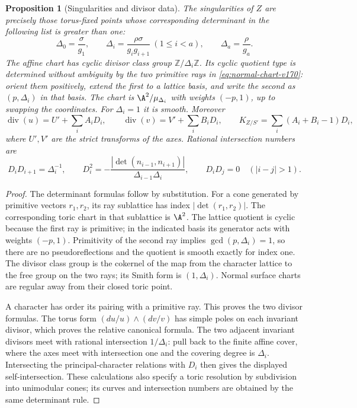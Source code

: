 \documentclass[11pt,reqno]{amsart}
\numberwithin{equation}{section}
\newtheorem{proposition}[theorem]{Proposition}
\theoremstyle{definition}\newtheorem{definition}[theorem]{Definition}
\theoremstyle{remark}\newtheorem{remark}[theorem]{Remark}
\begin{document}
\begin{proposition}[Singularities and divisor data]
\label{prop:ramified-singularities-v170}
The singularities of $Z$ are precisely those torus-fixed points whose
corresponding determinant in the following list is greater than one:
\begin{equation}\label{eq:cone-indices-v170}
 \Delta_0=\frac{\sigma}{g_1},\qquad
 \Delta_i=\frac{\rho\sigma}{g_i g_{i+1}}\ (1\leq i<a),\qquad
 \Delta_a=\frac{\rho}{g_a}.
\end{equation}
The affine chart has cyclic divisor class group
$\mathbb Z/\Delta_i\mathbb Z$. Its cyclic quotient type is determined
without ambiguity by the two primitive rays in
\eqref{eq:normal-chart-v170}: orient them positively, extend the
first to a lattice basis, and write the second as $(p,\Delta_i)$
in that basis. The chart is $\A^2/\mu_{\Delta_i}$ with weights
$(-p,1)$, up to swapping the coordinates. For $\Delta_i=1$ it is smooth.
Moreover
\[
 \operatorname{div}(u)=U'+\sum_i A_iD_i,
 \qquad \operatorname{div}(v)=V'+\sum_i B_iD_i,
 \qquad K_{Z/S'}=\sum_i(A_i+B_i-1)D_i,
\]
where $U',V'$ are the strict transforms of the axes. Rational
intersection numbers are
\[
 D_iD_{i+1}=\Delta_i^{-1},\qquad
 D_i^2=-\frac{|\det(n_{i-1},n_{i+1})|}{\Delta_{i-1}\Delta_i},
 \qquad D_iD_j=0\quad(|i-j|>1).
\]
\end{proposition}
\begin{proof}
The determinant formulas follow by substitution. For a cone generated
by primitive vectors $r_1,r_2$, its ray sublattice has index
$|\det(r_1,r_2)|$. The corresponding toric chart in that sublattice
is $\A^2$. The lattice quotient is cyclic because the first ray is
primitive; in the indicated basis its generator acts with weights
$(-p,1)$. Primitivity of the second ray implies
$\gcd(p,\Delta_i)=1$, so there are no pseudoreflections and the
quotient is smooth exactly for index one. The divisor class group
is the cokernel of the map from the character lattice to the free
group on the two rays; its Smith form is $(1,\Delta_i)$.
Normal surface charts are regular away from their closed toric point.

A character has order its pairing with a primitive ray. This proves
the two divisor formulas. The torus form
$(du/u)\wedge(dv/v)$ has simple poles on each invariant divisor,
which proves the relative canonical formula. The two adjacent
invariant divisors meet with rational intersection $1/\Delta_i$:
pull back to the finite affine cover, where the axes meet with
intersection one and the covering degree is $\Delta_i$. Intersecting
the principal-character relations with $D_i$ then gives the displayed
self-intersection. These calculations also specify a toric resolution
by subdivision into unimodular cones; its curves and intersection
numbers are obtained by the same determinant rule.
\end{proof}
\end{document}
